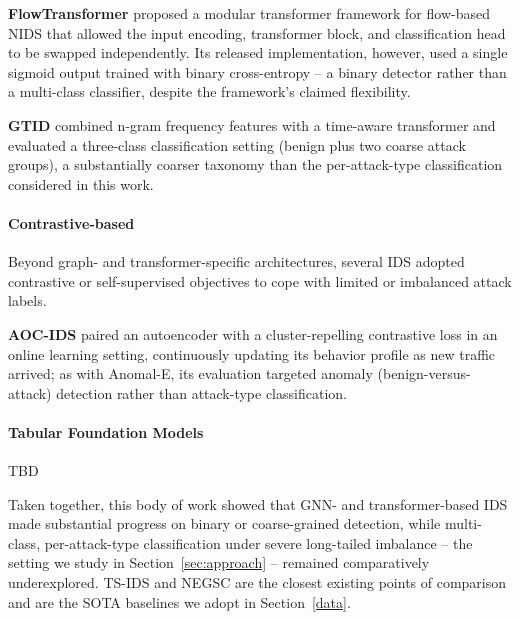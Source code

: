 \documentclass[sigconf]{acmart}
\begin{document}
\textbf{FlowTransformer} \citep{manocchio_flowtransformer_2024} proposed a modular transformer framework for flow-based NIDS that allowed the input encoding, transformer block, and classification head to be swapped independently. Its released implementation, however, used a single sigmoid output trained with binary cross-entropy -- a binary detector rather than a multi-class classifier, despite the framework's claimed flexibility.

\textbf{GTID} \citep{han_gtid_2023} combined n-gram frequency features with a time-aware transformer and evaluated a three-class classification setting (benign plus two coarse attack groups), a substantially coarser taxonomy than the per-attack-type classification considered in this work.

\paragraph{Contrastive-based}
Beyond graph- and transformer-specific architectures, several IDS adopted contrastive or self-supervised objectives to cope with limited or imbalanced attack labels. 

\textbf{AOC-IDS} \citep{zhang_aoc-ids_2024} paired an autoencoder with a cluster-repelling contrastive loss in an online learning setting, continuously updating its behavior profile as new traffic arrived; as with Anomal-E, its evaluation targeted anomaly (benign-versus-attack) detection rather than attack-type classification.

\paragraph{Tabular Foundation Models}
TBD

Taken together, this body of work showed that GNN- and transformer-based IDS made substantial progress on binary or coarse-grained detection, while multi-class, per-attack-type classification under severe long-tailed imbalance -- the setting we study in Section~\ref{sec:approach} -- remained comparatively underexplored. TS-IDS and NEGSC are the closest existing points of comparison and are the SOTA baselines we adopt in Section~\ref{data}.
\end{document}
